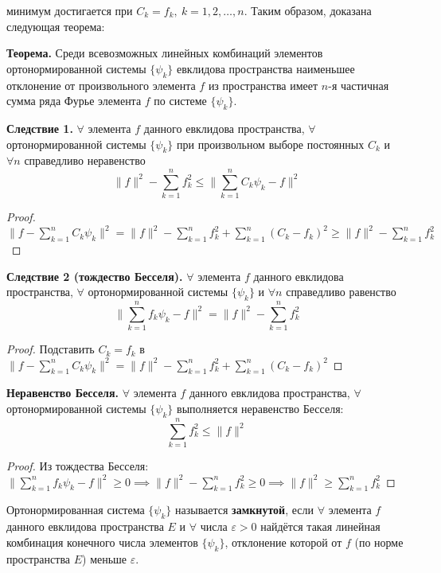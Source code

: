 минимум достигается при $ C_k = f_k,~k=1,2,\dots,n$. Таким образом, доказана следующая теорема:

\textbf{Теорема.} Среди всевозможных линейных комбинаций элементов ортонормированной системы $\{\psi_k\}$ евклидова пространства наименьшее отклонение от произвольного элемента  $f$ из пространства имеет $n$-я частичная сумма ряда Фурье элемента $f$ по системе $\{\psi_k\}$.

\textbf{Следствие 1.} $\forall$ элемента $f$ данного евклидова пространства, $\forall$ ортонормированной системы $\{\psi_k\}$ при произвольном выборе постоянных $C_k$ и $\forall n$ справедливо неравенство
$$ \| f \|^2-\displaystyle\sum_{k=1}^{n}f_k^2 \leqslant  \| \displaystyle\sum_{k=1}^{n}C_k\psi_k-f \|^2$$

\begin{proof}
$ \| f-\displaystyle\sum_{k=1}^{n}C_k\psi_k \|^2 = 
\| f\|^2 - \displaystyle\sum_{k=1}^{n}f_k^2 + \displaystyle\sum_{k=1}^{n}(C_k-f_k)^2 \geq \| f\|^2 - \displaystyle\sum_{k=1}^{n}f_k^2$
\end{proof}

\textbf{Следствие 2 (тождество Бесселя).} $\forall$ элемента $f$ данного евклидова пространства, $\forall$ ортонормированной системы $\{\psi_k\}$ и $\forall n$ справедливо равенство
$$ \| \displaystyle\sum_{k=1}^{n}f_k\psi_k-f \|^2 = \| f \|^2-\displaystyle\sum_{k=1}^{n}f_k^2$$

\begin{proof}
Подставить $C_k = f_k$ в $ \| f-\displaystyle\sum_{k=1}^{n}C_k\psi_k \|^2 = 
\| f\|^2 - \displaystyle\sum_{k=1}^{n}f_k^2 + \displaystyle\sum_{k=1}^{n}(C_k-f_k)^2$ 
\end{proof}

\textbf{Неравенство Бесселя.} $\forall$ элемента $f$ данного евклидова пространства, $\forall$ ортонормированной системы $\{\psi_k\}$ выполняется неравенство Бесселя: $$ \displaystyle\sum_{k=1}^{n}f_k^2 \leqslant \| f\|^2 $$

\begin{proof}
Из тождества Бесселя: $ \| \displaystyle\sum_{k=1}^{n}f_k\psi_k-f \|^2 \geq 0 \implies \| f \|^2-\displaystyle\sum_{k=1}^{n}f_k^2 \geq 0 \implies \| f \|^2 \geq \displaystyle\sum_{k=1}^{n}f_k^2$
\end{proof}

Ортонормированная система $\{\psi_k\}$ называется \textbf{замкнутой}, если $\forall$ элемента $f$ данного евклидова пространства $E$ и $\forall$ числа $\varepsilon > 0$ найдётся такая линейная комбинация конечного числа элементов $\{\psi_k\}$, отклонение которой от $f$ (по норме пространства $E$) меньше $\varepsilon$.

